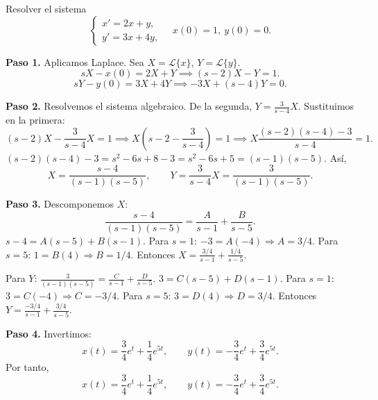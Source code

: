 \begin{example}
Resolver el sistema
\[
\begin{cases}
x' = 2x + y,\\
y' = 3x + 4y,
\end{cases}
\quad
x(0)=1,\ y(0)=0.
\]
\begin{myproof}
\textbf{Paso 1.} Aplicamos Laplace. Sea $X=\mathcal{L}\{x\}$, $Y=\mathcal{L}\{y\}$.
\[
sX - x(0) = 2X + Y \implies (s-2)X - Y = 1.
\]
\[
sY - y(0) = 3X + 4Y \implies -3X + (s-4)Y = 0.
\]

\textbf{Paso 2.} Resolvemos el sistema algebraico. De la segunda, $Y = \frac{3}{s-4}X$. Sustituimos en la primera:
\[
(s-2)X - \frac{3}{s-4}X = 1 \implies X\left( s-2 - \frac{3}{s-4} \right) = 1 \implies X \frac{(s-2)(s-4)-3}{s-4} = 1.
\]
$(s-2)(s-4)-3 = s^2-6s+8-3 = s^2-6s+5 = (s-1)(s-5)$.
Así,
\[
X = \frac{s-4}{(s-1)(s-5)},\qquad Y = \frac{3}{s-4}X = \frac{3}{(s-1)(s-5)}.
\]

\textbf{Paso 3.} Descomponemos $X$:
\[
\frac{s-4}{(s-1)(s-5)} = \frac{A}{s-1} + \frac{B}{s-5}.
\]
$s-4 = A(s-5)+B(s-1)$. Para $s=1$: $-3 = A(-4) \Rightarrow A=3/4$. Para $s=5$: $1 = B(4) \Rightarrow B=1/4$.
Entonces $X = \frac{3/4}{s-1} + \frac{1/4}{s-5}$.

Para $Y$: $\frac{3}{(s-1)(s-5)} = \frac{C}{s-1} + \frac{D}{s-5}$.
$3 = C(s-5)+D(s-1)$. Para $s=1$: $3 = C(-4) \Rightarrow C=-3/4$. Para $s=5$: $3 = D(4) \Rightarrow D=3/4$.
Entonces $Y = \frac{-3/4}{s-1} + \frac{3/4}{s-5}$.

\textbf{Paso 4.} Invertimos:
\[
x(t) = \frac{3}{4}e^{t} + \frac{1}{4}e^{5t},\qquad y(t) = -\frac{3}{4}e^{t} + \frac{3}{4}e^{5t}.
\]
Por tanto,
\[
\boxed{x(t) = \frac{3}{4}e^{t} + \frac{1}{4}e^{5t},\qquad y(t) = -\frac{3}{4}e^{t} + \frac{3}{4}e^{5t}.}
\]
\end{myproof}
\end{example}

